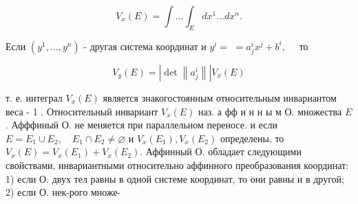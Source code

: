 \documentclass[10pt]{article}
\begin{document}
\[

V_{x}(E)=\int \ldots \int_{E} d x^{1} \ldots d x^{n} .

\]



Если $\left(y^{1}, \ldots, y^{n}\right)$ - другая система координат и $y^{i}=$ $=a_{j}^{i} x^{j}+b^{i}, \quad$ то



\[

V_{y}(E)=\left|\operatorname{det}\left\|a_{j}^{i}\right\|\right| V_{x}(E)

\]



т. е. интеграл $V_{x}(E)$ является знакогостоянным относительным инвариантом веса - 1 . Относительный инвариант $V_{x}(E)$ наз. а фф и н н ы м О. множества $E$. Афффиный О. не меняется при параллельном переносе. и если $E=E_{1} \cup E_{2}, \quad E_{1} \cap E_{2} \neq \varnothing$ и $V_{x}\left(E_{1}\right), V_{x}\left(E_{2}\right)$ определены, то $V_{x}(E)=V_{x}\left(E_{1}\right)+V_{x}\left(E_{2}\right)$. Аффинный О. обладает следующими свойствами, инвариантными относительно аффинного преобразования координат: 1) если О. двух тел равны в одной системе координат, то они равны и в другой; 2) если О. нек-рого множе-
\end{document}
